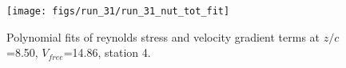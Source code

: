 \begin{figure}[H]
\centering
\texttt{[image: figs/run\_31/run\_31\_nut\_tot\_fit]}
\caption{Polynomial fits of reynolds stress and velocity gradient terms at $z/c$=8.50, $V_{free}$=14.86, station 4.}
\label{fig:run_31_nut_tot_fit}
\end{figure}


